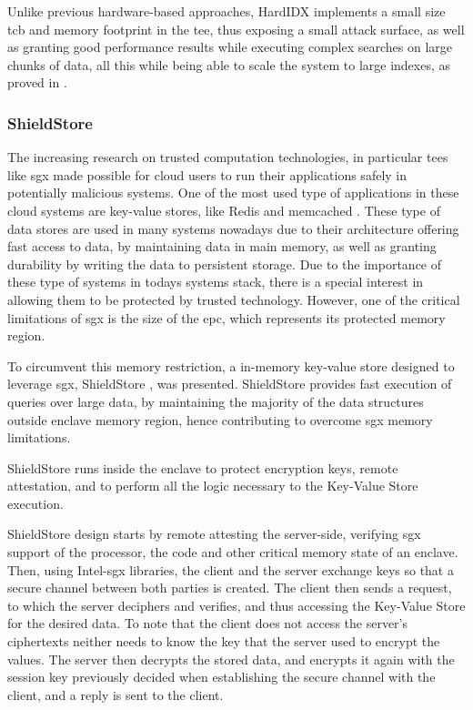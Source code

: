 Unlike previous hardware-based approaches, HardIDX implements a small size \gls{tcb} and memory footprint in the \gls{tee}, thus exposing a small attack surface, as well as granting good performance results while executing complex searches on large chunks of data, all this while being able to scale the system to large indexes, as proved in \cite{hardIDXPaper}. 



\subsubsection{ShieldStore}
\label{sssec:sgxShieldStore}

The increasing research on trusted computation technologies, in particular \gls{tee}s like \gls{sgx} made possible for cloud users to run their applications safely in potentially malicious systems. One of the most used type of applications in these cloud systems are key-value stores, like Redis \cite{redisWebsite} and memcached \cite{memcachedWebsite}. These type of data stores are used in many systems nowadays due to their architecture offering fast access to data, by maintaining data in main memory, as well as granting durability by writing the data to persistent storage.  Due to the importance of these type of systems in todays systems stack, there is a special interest in allowing them to be protected by trusted technology. However, one of the critical limitations of \gls{sgx} is the size of the \gls{epc}, which represents its protected memory region. 

To circumvent this memory restriction, a in-memory key-value store designed to leverage \gls{sgx}, ShieldStore \cite{shieldStorePaper}, was presented. ShieldStore provides fast execution of queries over large data, by maintaining the majority of the data structures outside enclave memory region, hence contributing to overcome \gls{sgx} memory limitations.

ShieldStore runs inside the enclave to protect encryption keys, remote attestation, and to perform all the logic necessary to the Key-Value Store execution.

ShieldStore design starts by remote attesting the server-side, verifying \gls{sgx} support of the processor, the code and other critical memory state of an enclave. Then, using Intel-\gls{sgx} libraries, the client and the server exchange keys so that a secure channel between both parties is created. The client then sends a request, to which the server deciphers and verifies, and thus accessing the Key-Value Store for the desired data. To note that the client does not access the server's ciphertexts neither needs to know the key that the server used to encrypt the values. The server then decrypts the stored data, and encrypts it again with the session key previously decided when establishing the secure channel with the client, and a reply is sent to the client.    

